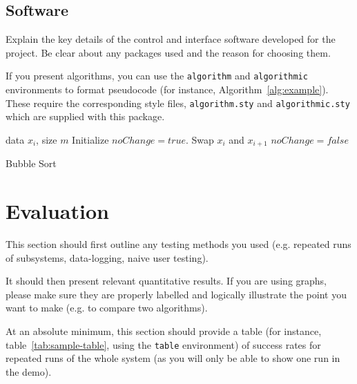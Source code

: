 \documentclass{article}
\begin{document}
\subsection{Software}

Explain the key details of the control and interface software developed for the project. Be clear about any packages used and the reason for choosing them. 

If you present algorithms, you can use the \verb+algorithm+ and \verb+algorithmic+ environments to format pseudocode (for instance, Algorithm~\ref{alg:example}). These require the corresponding style files, \verb+algorithm.sty+ and \verb+algorithmic.sty+ which are supplied with this package. 

\begin{algorithm}[ht]
\begin{algorithmic}
    data $x_i$, size $m$
   \REPEAT
   \STATE Initialize $noChange = true$.
   \STATE Swap $x_i$ and $x_{i+1}$
   \STATE $noChange = false$
   \ENDIF
   \ENDFOR
\end{algorithmic}
  \caption{Bubble Sort}
  \label{alg:example}
\end{algorithm}

\section{Evaluation}

This section should first outline any testing methods you used (e.g. repeated runs of subsystems, data-logging, naive user testing). 

It should then present relevant quantitative results. If you are using graphs, please make sure they are properly labelled and logically illustrate the point you want to make (e.g. to compare two algorithms).


At an absolute minimum, this section should provide a table (for instance, table~\ref{tab:sample-table}, using the \verb+table+ environment) of success rates for repeated runs of the whole system (as you will only be able to show one run in the demo).
\end{document}
